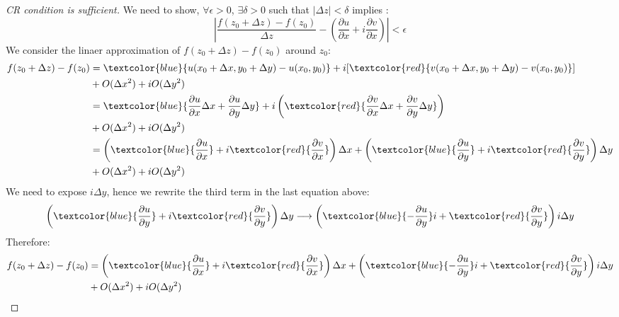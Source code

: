 \begin{theorem}
\end{theorem}\begin{proof}[CR condition is sufficient]We need to show, $\forall \epsilon >0$,  $\exists \delta >0$ such that $|\Delta z|<\delta$ implies :
\begin{equation}
\left| \frac{f(z_0+\Delta z)-f(z_0)}{\Delta z} - \left(\frac{\partial u}{\partial x} + i\frac{\partial v}{\partial x}\right) \right| < \epsilon
\end{equation}
We consider the linaer approximation of $f(z_0+\Delta z) -f(z_0)$ around $z_0$:
\begin{equation}
\begin{aligned}
f(z_0+\Delta z)-f(z_0)&=\textcolor{blue}{u(x_0+\Delta x,y_0+\Delta y)-u(x_0,y_0)} + i[\textcolor{red}{v(x_0+\Delta x, y_0+\Delta y)-v(x_0,y_0)}]
\\ &+ O(\Delta x^2) + iO(\Delta y^2) \\
&= \textcolor{blue}{\frac{\partial u}{\partial x}\Delta x +\frac{\partial u}{\partial y} \Delta y} +i\left(\textcolor{red}{\frac{\partial v}{\partial x}\Delta x +\frac{\partial v}{\partial y}\Delta y} \right) \\ &+ O(\Delta x^2)+iO(\Delta y^2) \\
&= \left(\textcolor{blue}{\frac{\partial u}{\partial x}}+i\textcolor{red}{\frac{\partial v}{\partial x}}\right)\Delta x+\left(\textcolor{blue}{\frac{\partial u}{\partial y}} + i\textcolor{red}{\frac{\partial v}{\partial y}}\right)\Delta y\\ &+ O(\Delta x^2)+iO(\Delta y^2) \\
\end{aligned}
\end{equation}
We need to expose $i\Delta y$, hence we rewrite the third term in the last equation above:
\begin{equation}
\left(\textcolor{blue}{\frac{\partial u}{\partial y}} + i\textcolor{red}{\frac{\partial v}{\partial y}}\right)\Delta y \longrightarrow \left(\textcolor{blue}{-\frac{\partial u}{\partial y}}i + \textcolor{red}{\frac{\partial v}{\partial y}}\right)i\Delta y
\end{equation}
Therefore:
\begin{equation}
\begin{aligned}
f(z_0+\Delta z)-f(z_0) &=  \left(\textcolor{blue}{\frac{\partial u}{\partial x}}+i\textcolor{red}{\frac{\partial v}{\partial x}}\right)\Delta x+\left(\textcolor{blue}{-\frac{\partial u}{\partial y}}i + \textcolor{red}{\frac{\partial v}{\partial y}}\right)i\Delta y\\ &+ O(\Delta x^2)+iO(\Delta y^2)

\end{aligned}
\end{equation}
\end{proof}
